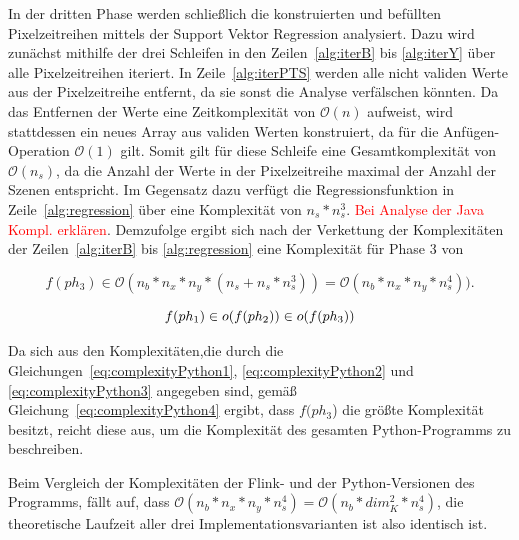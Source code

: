 In der dritten Phase werden schließlich die konstruierten und befüllten Pixelzeitreihen mittels der Support Vektor Regression analysiert. Dazu wird zunächst mithilfe der drei Schleifen in den Zeilen~\ref{alg:iterB} bis \ref{alg:iterY} über alle Pixelzeitreihen iteriert. In Zeile~\ref{alg:iterPTS} werden alle nicht validen Werte aus der Pixelzeitreihe entfernt, da sie sonst die Analyse verfälschen könnten. Da das Entfernen der Werte eine Zeitkomplexität von $\mathcal{O}(n)$ aufweist, wird stattdessen ein neues Array aus validen Werten konstruiert, da für die Anfügen-Operation $\mathcal{O}(1)$ gilt. Somit gilt für diese Schleife eine Gesamtkomplexität von $\mathcal{O}(n_s)$, da die Anzahl der Werte in der Pixelzeitreihe maximal der Anzahl der Szenen entspricht. Im Gegensatz dazu verfügt die Regressionsfunktion in Zeile~\ref{alg:regression} über eine Komplexität von $n_s * n_s^3$. \textcolor{red}{Bei Analyse der Java Kompl. erklären}. Demzufolge ergibt sich nach der Verkettung der Komplexitäten der Zeilen~\ref{alg:iterB} bis \ref{alg:regression} eine Komplexität für Phase 3 von 

\begin{equation} \label{eq:complexityPython3}
f(ph_3) \in \mathcal{O}(n_b * n_x * n_y * (n_s + n_s * n_s^3)) = \mathcal{O}(n_b * n_x * n_y * n_s^4)).
\end{equation}

\begin{equation} \label{eq:complexityPython4}
f(ph_1) \in \mathnormal{o}(f(ph_2)) \in \mathnormal{o}(f(ph_3))
\end{equation}

Da sich aus den Komplexitäten,die durch die Gleichungen~\ref{eq:complexityPython1}, \ref{eq:complexityPython2} und \ref{eq:complexityPython3} angegeben sind, gemäß Gleichung~\ref{eq:complexityPython4} ergibt, dass $f(ph_3$) die größte Komplexität besitzt, reicht diese aus, um die Komplexität des gesamten Python-Programms zu beschreiben.

Beim Vergleich der Komplexitäten der Flink- und der Python-Versionen des Programms, fällt auf, dass  $\mathcal{O}(n_b * n_x * n_y * n_s^4) = \mathcal{O}(n_b * dim_{K}^2 * n_s^4)$, die theoretische Laufzeit aller drei Implementationsvarianten ist also identisch ist.

